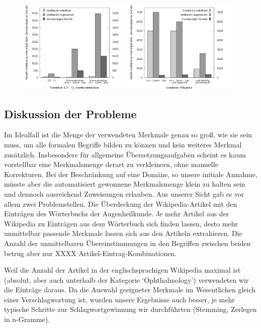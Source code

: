 \documentclass[pagesize,DIV=calc,12pt,draft]{scrreprt}
\begin{document}
\begin{figure}[!ht]
\includegraphics[width=0.48\textwidth]{icd10_affixe}
\hfill
\includegraphics[width=0.48\textwidth]{wiki_extraktion}
\end{figure}

\subsection{Diskussion der Probleme}

Im Idealfall ist die Menge der verwendeten Merkmale genau so groß, wie
sie sein muss, um alle formalen Begriffe bilden zu können und kein
weiteres Merkmal zusätzlich. Insbesondere für allgemeine
Übersetzungsaufgaben scheint es kaum vorstellbar eine Merkmalsmenge
derart zu verkleinern, ohne manuelle Korrekturen. Bei der Beschränkung
auf eine Domäne, so unsere initiale Annahme, müsste aber die
automatisiert gewonnene Merkmalsmenge klein zu halten sein und dennoch
ausreichend Zuweisungen erlauben. Aus unserer Sicht gab es vor allem
zwei Problemstellen. Die Überdeckung der Wikipedia-Artikel mit den
Einträgen des Wörterbuchs der Augenheilkunde. Je mehr Artikel aus der
Wikipedia zu Einträgen aus dem Wörterbuch sich finden lassen, desto mehr
unmittelbar passende Merkmale lassen sich aus den Artikeln extrahieren.
Die Anzahl der unmittelbaren Übereinstimmungen in den Begriffen zwischen
beiden betrug aber nur XXXX Artikel-Eintrag-Kombinationen.

Weil die Anzahl der Artikel in der englischsprachigen Wikipedia maximal
ist (absolut, aber auch unterhalb der Kategorie `Ophthalmology')
verwendeten wir die Einträge daraus. Da die Auswahl geeigneter Merkmale
im Wesentlichen gleich einer Verschlagwortung ist, wurden unsere
Ergebnisse auch besser, je mehr typische Schritte zur
Schlagwortgewinnung wir durchführten (Stemming, Zerlegen in n-Gramme).
\end{document}

